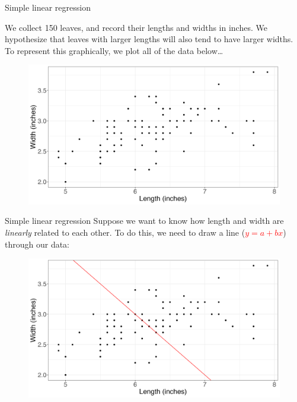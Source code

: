 \documentclass[10pt,t]{beamer}
\begin{document}
\begin{frame}{Simple linear regression}

We collect 150 leaves, and record their lengths and widths in inches. We hypothesize that leaves with larger lengths will also tend to have larger widths. To represent this graphically, we plot all of the data below\dots

\vspace{0.3cm}

\begin{figure}
	\centering \includegraphics[scale=0.35]{points.png}
\end{figure}

\end{frame}

\begin{frame}{Simple linear regression}
Suppose we want to know how length and width are \textit{linearly} related to each other. To do this, we need to draw a line (\textcolor{red}{$y = a + bx$}) through our data:

\vspace{0.3cm}
\begin{figure}
\centering \includegraphics[scale=0.35]{points2.png}
\end{figure}

\end{frame}
\end{document}
